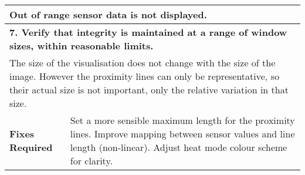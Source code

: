 \begin{longtable}{ l p{10cm} }
 \multicolumn{2}{p{14cm}}{Out of range sensor data is not displayed.}\\
 \hline
 \multicolumn{2}{p{14cm}}{\textbf{7. Verify that integrity is maintained at a range of window sizes, within reasonable limits.}}\\
 \multicolumn{2}{p{14cm}}{The size of the visualisation does not change with the size of the image. However the proximity lines can only be representative, so their actual size is not important, only the relative variation in that size.}\\
 \hline
 \textbf{Fixes Required} & Set a more sensible maximum length for the proximity lines. Improve mapping between sensor values and line length (non-linear). Adjust heat mode colour scheme for clarity.\\
 \bottomrule
\end{longtable}
\clearpage

